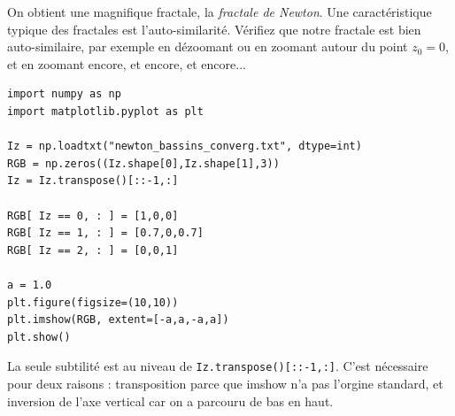 \documentclass{book}
\begin{document}
On obtient une magnifique fractale, la \emph{fractale de Newton}. Une caractéristique typique des fractales est l'auto-similarité. Vérifiez que notre fractale est bien auto-similaire, par exemple en dézoomant ou en zoomant autour du point $z_0=0$, et en zoomant encore, et encore, et encore...\\

\begin{correction}
\begin{verbatim}
import numpy as np
import matplotlib.pyplot as plt

Iz = np.loadtxt("newton_bassins_converg.txt", dtype=int)
RGB = np.zeros((Iz.shape[0],Iz.shape[1],3))
Iz = Iz.transpose()[::-1,:]

RGB[ Iz == 0, : ] = [1,0,0]
RGB[ Iz == 1, : ] = [0.7,0,0.7]
RGB[ Iz == 2, : ] = [0,0,1]

a = 1.0
plt.figure(figsize=(10,10))
plt.imshow(RGB, extent=[-a,a,-a,a])
plt.show()
\end{verbatim}

La seule subtilité est au niveau de \texttt{Iz.transpose()[::-1,:]}. C'est nécessaire pour deux raisons : transposition parce que imshow n'a pas l'orgine standard, et inversion de l'axe vertical car on a parcouru de bas en haut.\\


\end{correction}
\end{document}
